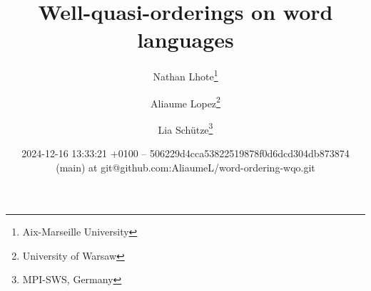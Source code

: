 %

\title{Well-quasi-orderings on word languages}
\author{%
        Nathan Lhote\thanks{Aix-Marseille University}
     \and
        Aliaume Lopez\thanks{University of Warsaw}
     \and
        Lia Schütze\thanks{MPI-SWS, Germany}
    }

\date{2024-12-16 13:33:21
+0100 -- 506229d4cca53822519878f0d6dcd304db873874 (main) at git@github.com:AliaumeL/word-ordering-wqo.git}

\newcommand{\makeabstract}{
\begin{abstract}
    The set of finite words over a well-quasi-ordered set is itself
    well-quasi-ordered. This seminal result by Higman is a cornerstone
    of the theory of well-quasi-orderings and has found numerous
    applications in computer science. However, this result is based on a
    specific choice of ordering on words, the (scattered) subword
    ordering. In this paper, we describe to what extent other natural
    orderings (prefix, suffix, and infix) on words can be used to derive
    Higman-like theorems. More specifically, we are interested in
    characterizing \emph{languages} of words that are well-quasi-ordered
    under these orderings. We show that a simple characterization is
    possible for the prefix and suffix orderings, and that under extra
    regularity assumptions, this also extends to the infix ordering.
\end{abstract}
}
